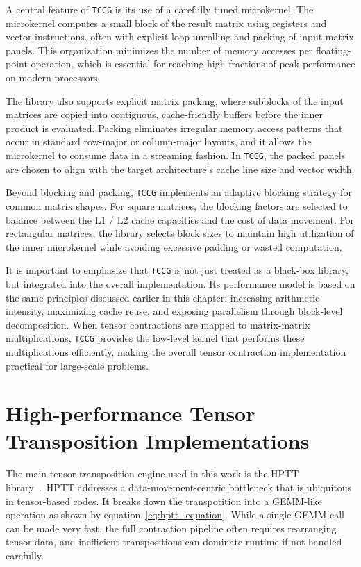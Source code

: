 A central feature of \texttt{\ac{TCCG}} is its use of a carefully tuned microkernel. The microkernel computes a small block of the result matrix using registers and vector instructions, often with explicit loop unrolling and packing of input matrix panels. This organization minimizes the number of memory accesses per floating-point operation, which is essential for reaching high fractions of peak performance on modern processors.

The library also supports explicit matrix packing, where subblocks of the input matrices are copied into contiguous, cache-friendly buffers before the inner product is evaluated. Packing eliminates irregular memory access patterns that occur in standard row-major or column-major layouts, and it allows the microkernel to consume data in a streaming fashion. In \texttt{\ac{TCCG}}, the packed panels are chosen to align with the target architecture's cache line size and vector width.

Beyond blocking and packing, \texttt{\ac{TCCG}} implements an adaptive blocking strategy for common matrix shapes. For square matrices, the blocking factors are selected to balance between the L1 / L2 cache capacities and the cost of data movement. For rectangular matrices, the library selects block sizes to maintain high utilization of the inner microkernel while avoiding excessive padding or wasted computation.

It is important to emphasize that \texttt{\ac{TCCG}} is not just treated as a black-box library, but integrated into the overall implementation. Its performance model is based on the same principles discussed earlier in this chapter: increasing arithmetic intensity, maximizing cache reuse, and exposing parallelism through block-level decomposition. When tensor contractions are mapped to matrix-matrix multiplications, \texttt{\ac{TCCG}} provides the low-level kernel that performs these multiplications efficiently, making the overall tensor contraction implementation practical for large-scale problems.

\section{High-performance Tensor Transposition Implementations}

The main tensor transposition engine used in this work is the \ac{HPTT} library~\cite{springer2017hptt}.\ \ac{HPTT} addresses a data-movement-centric bottleneck that is ubiquitous in tensor-based codes. It breaks down the transpotition into a \ac{GEMM}-like operation as shown by equation~\ref{eq:hptt_equation}. While a single \ac{GEMM} call can be made very fast, the full contraction pipeline often requires rearranging tensor data, and inefficient transpositions can dominate runtime if not handled carefully.

